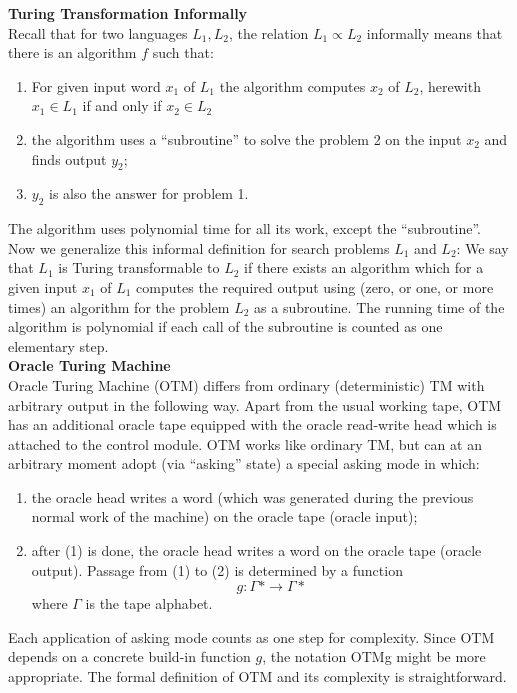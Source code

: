 \textbf{Turing Transformation Informally}\\
Recall that for two languages $L_1 , L_2$,
the relation $L_1 \propto L_2$ informally means that there is an algorithm $f$ such that:
\begin{enumerate}
    \item
        For given input word $x_1$ of $L_1$ the algorithm computes $x_2$ of $L_2$,
        herewith $x_1 \in L_1$ if and only if $x_2 \in L_2$
    \item the algorithm uses a “subroutine” to solve the problem 2 on the input $x_2$ and finds output $y_2$;
    \item $y_2$ is also the answer for problem 1.
\end{enumerate}
The algorithm uses polynomial time for all its work,
except the “subroutine”.
Now we generalize this informal definition for search problems $L_1$ and $L_2$:
We say that $L_1$ is Turing transformable to $L_2$
if there exists an algorithm which for a given input $x_1$ of $L_1$
computes the required output using (zero, or one, or more times) an algorithm
for the problem $L_2$ as a subroutine.
The running time of the algorithm is polynomial
if each call of the subroutine is counted as one elementary step.\\

\textbf{Oracle Turing Machine}\\
Oracle Turing Machine (OTM) differs from ordinary (deterministic) TM
with arbitrary output in the following way.
Apart from the usual working tape,
OTM has an additional oracle tape equipped with the oracle read-write head
which is attached to the control module.
OTM works like ordinary TM,
but can at an arbitrary moment adopt (via “asking” state) a special asking mode in which:
\begin{enumerate}
    \item the oracle head writes a word (which was generated during the previous normal work of the machine) on the oracle tape (oracle input);
    \item after (1) is done,
        the oracle head writes a word on the oracle tape (oracle output).
        Passage from (1) to (2) is determined by a function
        $$g: \Gamma\ast \rightarrow \Gamma\ast$$
        where $\Gamma$ is the tape alphabet.
\end{enumerate}
Each application of asking mode counts as one step for complexity.
Since OTM depends on a concrete build-in function $g$,
the notation OTMg might be more appropriate.
The formal definition of OTM and its complexity is straightforward.\\

